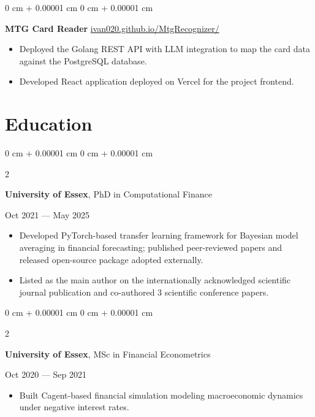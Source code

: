 \documentclass[letterpaper]{article}
\newenvironment{highlights}{
    \begin{itemize}[
        topsep=0.03 cm,
        parsep=0.03 cm,
        partopsep=0pt,
        itemsep=0pt,
        leftmargin=0 cm + 10pt
    \]
}{
    \end{itemize}
} %
\newenvironment{onecolentry}{
    \begin{adjustwidth}{
        0 cm + 0.00001 cm
    }{
        0 cm + 0.00001 cm
    }
}{
    \end{adjustwidth}
} %
\newenvironment{twocolentry}[2][]{
    \onecolentry
    \def\secondColumn{#2}
    \setcolumnwidth{\fill, 4.5 cm}
    \begin{paracol}{2}
}{
    \switchcolumn \raggedleft \secondColumn
    \end{paracol}
    \endonecolentry
} %
\let\hrefWithoutArrow\href
\begin{document}
    \begin{onecolentry}
        \textbf{MTG Card Reader} \hfill \hrefWithoutArrow{https://ivan020.github.io/MtgRecognizer/}{ivan020.github.io/MtgRecognizer/}

        \begin{highlights}
            \item Deployed the Golang REST API with LLM integration to map the card data against the PostgreSQL database.
            \item Developed React application deployed on Vercel for the project frontend.
        \end{highlights}
    \end{onecolentry}

    \section{Education}

            \begin{twocolentry}{
                Oct 2021 --- May 2025
            }
            \textbf{University of Essex}, PhD in Computational Finance
            \end{twocolentry}

            \begin{highlights}
            \item Developed PyTorch-based transfer learning framework for Bayesian model averaging in financial forecasting; published peer-reviewed papers and released open-source package adopted externally.
            \item Listed as the main author on the internationally acknowledged scientific journal publication and co-authored 3 scientific conference papers.
            \end{highlights}

            \begin{twocolentry}{
                Oct 2020 --- Sep 2021
            }
            \textbf{University of Essex}, MSc in Financial Econometrics
            \end{twocolentry}

            \begin{highlights}
            \item Built C\textplus\textplus agent-based financial simulation modeling macroeconomic dynamics under negative interest rates.
            \end{highlights}
\end{document}

